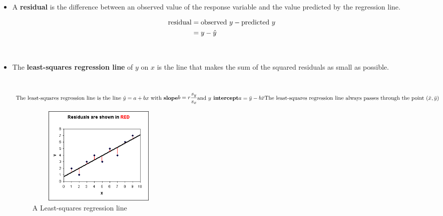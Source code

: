 \documentclass[Main.tex]{subfiles}
\begin{document}
	\begin{exercise} \hfill \\
		\begin{itemize}	
			\item A \textbf{residual} is the difference between an observed value of the response variable and the value predicted by the regression line.
				
				\begin{definition}[Residual]
					\begin{subequations}
						\begin{align}
						\text{residual}&=\text{observed $y$}-\text{predicted $y$}\\ \notag
						&=y-\hat{y}
						\end{align}
					\end{subequations}
				\end{definition}\hfill \\

			\item The \textbf{least-squares regression line} of $y$ on $x$ is the line that makes the sum of the squared residuals as small as possible.
			
				\begin{definition}\hfill \\ \hfill 
					\begin{subequations}
					\text{The least-squares regression line is the line $\hat{y}=a+bx$ with \textbf{slope}}
						\begin{align}
						b=r\frac{s_{y}}{s_{x}}
						\end{align}
					\text{and \textbf{$y$ intercept}}
						\begin{align}
						a=\bar{y}-b\bar{x}
						\end{align}
					\text{The least-squares regression line always passes through the point ($\bar{x},\bar{y}$)}
					\end{subequations}
				\end{definition}
									
			\begin{figure}[H]
				\centering
				\includegraphics[height=4.7cm,width=7cm]{LSRegression}
				\caption{A Least-squares regression line}
				\label{Least-squares regression line}
			\end{figure}
			

\end{itemize}
\end{exercise}
\end{document}

